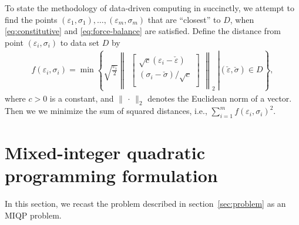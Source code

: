 \documentclass[a4paper,11pt]{scrartcl}
\theoremstyle{plain}
\theoremstyle{definition}
\theoremstyle{remark}
\begin{document}
To state the methodology of data-driven computing in \cite{KO16} 
succinctly, we attempt to find the points 
$(\varepsilon_{1},\sigma_{1}),\dots,(\varepsilon_{m},\sigma_{m})$ that 
are ``closest'' to $D$, when \eqref{eq:constitutive} and 
\eqref{eq:force-balance} are satisfied. 
Define the distance from point $(\varepsilon_{i},\sigma_{i})$ to 
data set $D$ by 
\begin{align}
  f(\varepsilon_{i},\sigma_{i}) 
  = \min 
  \left\{\left.
  \sqrt{ \frac{v_{i}}{2} }
  \begin{Vmatrix}
    \begin{bmatrix}
      \sqrt{c} (\varepsilon_{i} - \check{\varepsilon}) \\
      (\sigma_{i} - \check{\sigma}) / \sqrt{c} \\
    \end{bmatrix}
  \end{Vmatrix}
  _{2}
  \ \right|
  (\check{\varepsilon}, \check{\sigma}) \in D 
  \right\} , 
  \label{eq:distance}
\end{align}
where $c > 0$ is a constant, and 
$\| \,\cdot\, \|_{2}$ denotes the Euclidean norm of a vector. 
Then we we minimize the sum of squared distances, i.e., 
$\sum_{i=1}^{m} f(\varepsilon_{i},\sigma_{i})^{2}$. 

























\section{Mixed-integer quadratic programming formulation}
\label{sec:mixed}

In this section, we recast the problem described in 
section~\ref{sec:problem} as an MIQP problem. 
\end{document}
